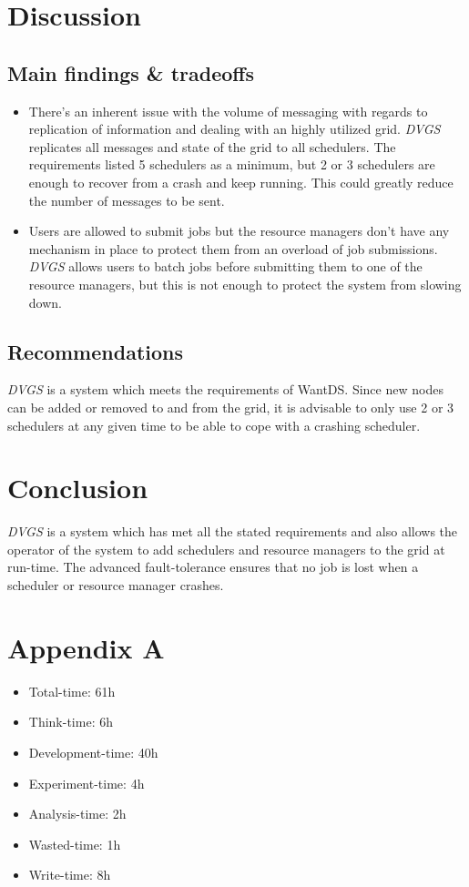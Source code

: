 \documentclass{article}
\begin{document}
\section{Discussion}
\label{sec:discussion}

\subsection{Main findings \& tradeoffs}

\begin{itemize}
\item There's an inherent issue with the volume of messaging with regards to replication of information and dealing with an highly utilized grid. \textit{DVGS} replicates all messages and state of the grid to all schedulers. The requirements listed 5 schedulers as a minimum, but 2 or 3 schedulers are enough to recover from a crash and keep running. This could greatly reduce the number of messages to be sent.
\item Users are allowed to submit jobs but the resource managers don't have any mechanism in place to protect them from an overload of job submissions. \textit{DVGS} allows users to batch jobs before submitting them to one of the resource managers, but this is not enough to protect the system from slowing down. 
\end{itemize}

\subsection{Recommendations}

\textit{DVGS} is a system which meets the requirements of WantDS. Since new nodes can be added or removed to and from the grid, it is advisable to only use 2 or 3 schedulers at any given time to be able to cope with a crashing scheduler.

\section{Conclusion}
\label{sec:conclusion}

\textit{DVGS} is a system which has met all the stated requirements and also allows the operator of the system to add schedulers and resource managers to the grid at run-time. The advanced fault-tolerance ensures that no job is lost when a scheduler or resource manager crashes.

\section{Appendix A}

\begin{itemize}
\item Total-time: 61h
\item Think-time: 6h
\item Development-time: 40h
\item Experiment-time: 4h
\item Analysis-time: 2h
\item Wasted-time: 1h
\item Write-time: 8h
\end{itemize}
\end{document}
